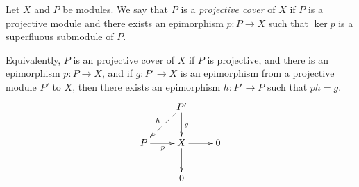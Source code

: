 \documentclass{article}
\begin{document}
Let $X$ and $P$ be modules.
We say that $P$ is a {\it projective cover} of $X$
if $P$ is a projective module
and there exists an epimorphism $p \colon P \to X$
such that $\operatorname{ker} p$ is a superfluous submodule of $P$.

Equivalently, $P$ is an projective cover of $X$
if $P$ is projective,
and there is an epimorphism $p \colon P \to X$,
and if $g \colon P' \to X$ is an epimorphism
from a projective module $P'$ to $X$,
then there exists an epimorphism $h \colon P' \to P$
such that $ph = g$.
$$
\xymatrix{
  &
  P'
        \ar[d]^g
        \ar@{-->}[dl]_h
  \\
  P
        \ar[r]_p
  &
  X
        \ar[r]
        \ar[d]
  &
  0
  \\
  &
  0
}
$$
\end{document}
